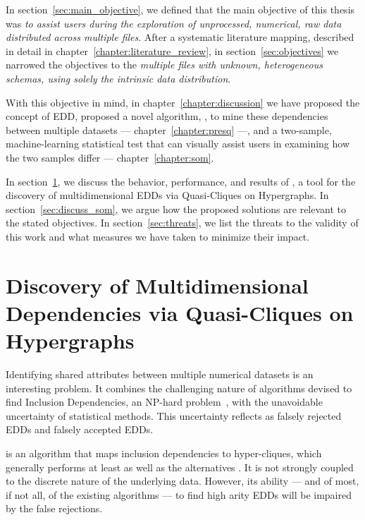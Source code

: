 \glsresetall

In section~\ref{sec:main_objective}, we defined that the main objective of this thesis
was \emph{to assist users during the exploration of unprocessed,
numerical, raw data distributed across multiple files}.
After a systematic literature mapping,
described in detail in chapter~\ref{chapter:literature_review}, in section~\ref{sec:objectives} we
narrowed the objectives to the \emph{multiple files with unknown, heterogeneous schemas, using solely the intrinsic data distribution}.

With this objective in mind, in chapter~\ref{chapter:discussion}
we have proposed the concept of \gls{EDD},
proposed a novel algorithm, \PresQ, to mine these dependencies between multiple
datasets --- chapter~\ref{chapter:presq} ---, and a two-sample, machine-learning statistical
test that can visually assist users in examining how the two samples differ --- 
chapter~\ref{chapter:som}.

In section~\ref{sec:discuss_presq}, we discuss the behavior, performance, and results of
\PresQ, a tool for the discovery of multidimensional \glspl{EDD} via Quasi-Cliques
on Hypergraphs. In section~\ref{sec:discuss_som}, we argue how the
proposed solutions are relevant to the stated objectives. In
section~\ref{sec:threats}, we list the threats to the validity of this work and
what measures we have taken to minimize their impact.

\section{Discovery of Multidimensional Dependencies via Quasi-Cliques on Hypergraphs}
\label{sec:discuss_presq}

Identifying shared attributes between multiple numerical datasets is an interesting
problem. It combines the challenging nature of algorithms devised to find Inclusion Dependencies,
an NP-hard problem~\cite{kantola1992}, with the unavoidable uncertainty of statistical
methods.
This uncertainty reflects as falsely rejected \glspl{EDD} and falsely accepted \glspl{EDD}.

\Find is an algorithm that maps inclusion dependencies to hyper-cliques,
which generally performs  at least as well as the alternatives \cite{Dursch2019}.
It is not strongly coupled to the discrete nature of the underlying data.
However, its ability --- and of most, if not all, of the existing algorithms --- to find
high arity \glspl{EDD} will be impaired by the false rejections.

